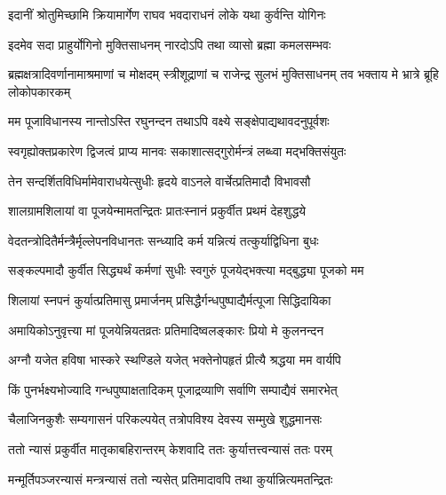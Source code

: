 


\addtocounter{shlokacount}{7}
\twolineshloka
{इदानीं श्रोतुमिच्छामि क्रियामार्गेण राघव}
{भवदाराधनं लोके यथा कुर्वन्ति योगिनः} %

\twolineshloka
{इदमेव सदा प्राहुर्योगिनो मुक्तिसाधनम्}
{नारदोऽपि तथा व्यासो ब्रह्मा कमलसम्भवः} %

\threelineshloka
{ब्रह्मक्षत्रादिवर्णानामाश्रमाणां च मोक्षदम्}
{स्त्रीशूद्राणां च राजेन्द्र सुलभं मुक्तिसाधनम्}
{तव भक्ताय मे भ्रात्रे ब्रूहि लोकोपकारकम्} %


\twolineshloka
{मम पूजाविधानस्य नान्तोऽस्ति रघुनन्दन}
{तथाऽपि वक्ष्ये सङ्क्षेपाद्यथावदनुपूर्वशः} %

\twolineshloka
{स्वगृह्योक्तप्रकारेण द्विजत्वं प्राप्य मानवः}
{सकाशात्सद्गुरोर्मन्त्रं लब्ध्वा मद्भक्तिसंयुतः} %

\twolineshloka
{तेन सन्दर्शितविधिर्मामेवाराधयेत्सुधीः}
{हृदये वाऽनले वार्चेत्प्रतिमादौ विभावसौ} %

\twolineshloka
{शालग्रामशिलायां वा पूजयेन्मामतन्द्रितः}
{प्रातःस्नानं प्रकुर्वीत प्रथमं देहशुद्धये} %

\twolineshloka
{वेदतन्त्रोदितैर्मन्त्रैर्मृल्लेपनविधानतः}
{सन्ध्यादि कर्म यन्नित्यं तत्कुर्याद्विधिना बुधः} %

\twolineshloka
{सङ्कल्पमादौ कुर्वीत सिद्ध्यर्थं कर्मणां सुधीः}
{स्वगुरुं पूजयेद्भक्त्या मद्बुद्ध्या पूजको मम} %

\twolineshloka
{शिलायां स्नपनं कुर्यात्प्रतिमासु प्रमार्जनम्}
{प्रसिद्धैर्गन्धपुष्पाद्यैर्मत्पूजा सिद्धिदायिका} %

\twolineshloka
{अमायिकोऽनुवृत्त्या मां पूजयेन्नियतव्रतः}
{प्रतिमादिष्वलङ्कारः प्रियो मे कुलनन्दन} %

\twolineshloka
{अग्नौ यजेत हविषा भास्करे स्थण्डिले यजेत्}
{भक्तेनोपहृतं प्रीत्यै श्रद्धया मम वार्यपि} %

\twolineshloka
{किं पुनर्भक्ष्यभोज्यादि गन्धपुष्पाक्षतादिकम्}
{पूजाद्रव्याणि सर्वाणि सम्पाद्यैवं समारभेत्} %

\twolineshloka
{चैलाजिनकुशैः सम्यगासनं परिकल्पयेत्}
{तत्रोपविश्य देवस्य सम्मुखे शुद्धमानसः} %

\twolineshloka
{ततो न्यासं प्रकुर्वीत मातृकाबहिरान्तरम्}
{केशवादि ततः कुर्यात्तत्त्वन्यासं ततः परम्} %

\twolineshloka
{मन्मूर्तिपञ्जरन्यासं मन्त्रन्यासं ततो न्यसेत्}
{प्रतिमादावपि तथा कुर्यान्नित्यमतन्द्रितः} %

